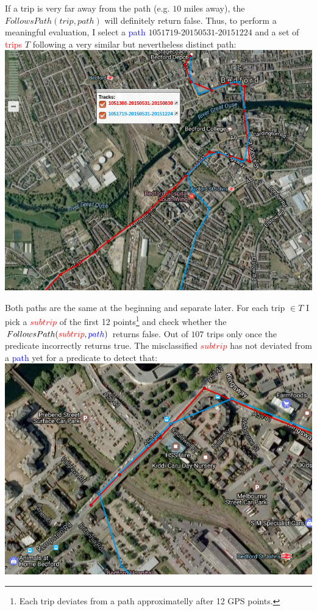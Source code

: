 \documentclass[12pt,a4paper,oneside,openright]{report}
\begin{document}
If a trip is very far away from the path (e.g. $10$ miles away), the
$FollowsPath(trip, path)$ will definitely return false. Thus, to perform
a meaningful evaluation, I select a \textcolor{blue}{path}
$1051719$-$20150531$-$20151224$ and a set of \textcolor{red}{trips}
$T$ following a very similar but nevertheless distinct path: \\

\includegraphics[scale = 0.6]{figs/similar_paths.png}

Both paths are the same at the beginning and separate later. For each
trip $\in T$ I pick a \textcolor{red}{$subtrip$} of the first 12
points\footnote{Each trip deviates from a path approximatelly after 12 GPS
points.} and check whether the
$FollowsPath(\textcolor{red}{subtrip}, \textcolor{blue}{path})$ 
returns false. Out of $107$ trips only once the predicate incorrectly returns
true. The misclassified \textcolor{red}{$subtrip$} has not deviated from a
\textcolor{blue}{path} yet for a predicate to detect that: \\

\includegraphics[scale = 0.6]{figs/misclassified_trip.png}
\end{document}
